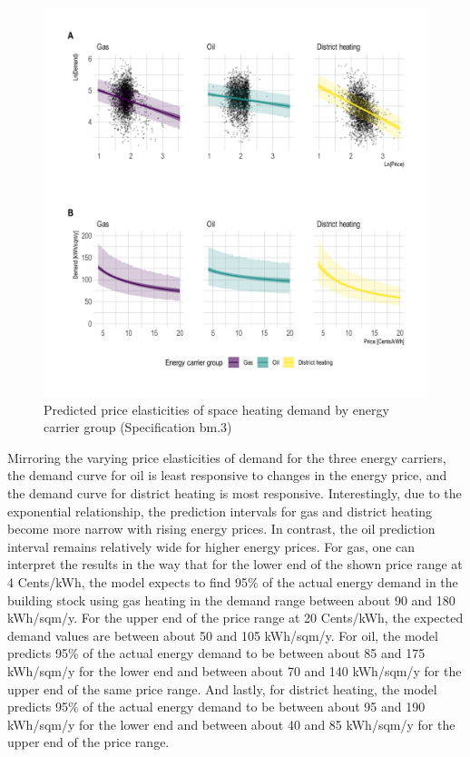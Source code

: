 \documentclass[12pt,twoside]{reedthesis}
\begin{document}
\begin{figure}

{\centering \includegraphics[width=1.04\linewidth]{figure/elasticity_predictions_subsample} 

}

\caption{Predicted price elasticities of space heating demand by energy carrier group (Specification bm.3)}\label{fig:elasticity-predictions-energy-carrier}
\end{figure}
Mirroring the varying price elasticities of demand for the three energy carriers, the demand curve for oil is least responsive to changes in the energy price, and the demand curve for district heating is most responsive. Interestingly, due to the exponential relationship, the prediction intervals for gas and district heating become more narrow with rising energy prices. In contrast, the oil prediction interval remains relatively wide for higher energy prices. For gas, one can interpret the results in the way that for the lower end of the shown price range at 4 Cents/kWh, the model expects to find 95\% of the actual energy demand in the building stock using gas heating in the demand range between about 90 and 180 kWh/sqm/y. For the upper end of the price range at 20 Cents/kWh, the expected demand values are between about 50 and 105 kWh/sqm/y. For oil, the model predicts 95\% of the actual energy demand to be between about 85 and 175 kWh/sqm/y for the lower end and between about 70 and 140 kWh/sqm/y for the upper end of the same price range. And lastly, for district heating, the model predicts 95\% of the actual energy demand to be between about 95 and 190 kWh/sqm/y for the lower end and between about 40 and 85 kWh/sqm/y for the upper end of the price range.
\end{document}
